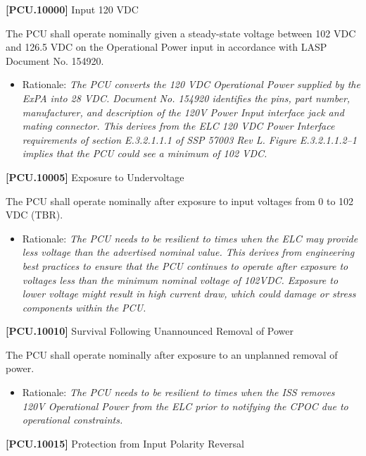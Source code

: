 \textbf{[PCU.10000]} Input 120 \gls{VDC}

The \gls{PCU} shall operate nominally given a steady-state voltage between 102 \gls{VDC} and 126.5 \gls{VDC} on the Operational Power input in accordance with \gls{LASP} Document No. 154920.

\begin{itemize}
\item{} Rationale: \emph{The PCU converts the 120 VDC Operational Power supplied by the ExPA into 28 VDC. Document No. 154920 identifies the pins, part number, manufacturer, and description of the 120V Power Input interface jack and mating connector. This derives from the ELC 120 VDC Power Interface requirements of section E.3.2.1.1.1 of SSP 57003 Rev L. Figure E.3.2.1.1.2--1 implies that the PCU could see a minimum of 102 VDC.}

\end{itemize}

\textbf{[PCU.10005]} Exposure to Undervoltage

The \gls{PCU} shall operate nominally after exposure to input voltages from 0 to 102 \gls{VDC} (TBR\label{tbx_4}).

\begin{itemize}
\item{} Rationale: \emph{The PCU needs to be resilient to times when the ELC may provide less voltage than the advertised nominal value. This derives from engineering best practices to ensure that the PCU continues to operate after exposure to voltages less than the minimum nominal voltage of 102VDC. Exposure to lower voltage might result in high current draw, which could damage or stress components within the PCU.}

\end{itemize}

\textbf{[PCU.10010]} Survival Following Unannounced Removal of Power

The \gls{PCU} shall operate nominally after exposure to an unplanned removal of power.

\begin{itemize}
\item{} Rationale: \emph{The PCU needs to be resilient to times when the ISS removes 120V Operational Power from the ELC prior to notifying the CPOC due to operational constraints.}

\end{itemize}

\textbf{[PCU.10015]} Protection from Input Polarity Reversal

